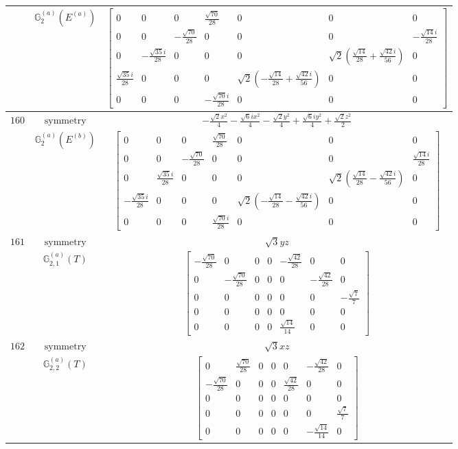 \documentclass[fleqn,8pt,landscape]{jsarticle}
\begin{document}
\begin{longtable}{ccc}
$  $ & $ \mathbb{G}_{2}^{(a)}(E^{(a)}) $ & $ \begin{bmatrix} 0 & 0 & 0 & \frac{\sqrt{70}}{28} & 0 & 0 & 0 \\ 0 & 0 & - \frac{\sqrt{70}}{28} & 0 & 0 & 0 & - \frac{\sqrt{14} i}{28} \\ 0 & - \frac{\sqrt{35} i}{28} & 0 & 0 & 0 & \sqrt{2} \left(\frac{\sqrt{14}}{28} + \frac{\sqrt{42} i}{56}\right) & 0 \\ \frac{\sqrt{35} i}{28} & 0 & 0 & 0 & \sqrt{2} \left(- \frac{\sqrt{14}}{28} + \frac{\sqrt{42} i}{56}\right) & 0 & 0 \\ 0 & 0 & 0 & - \frac{\sqrt{70} i}{28} & 0 & 0 & 0 \end{bmatrix} $ \\ \hline
$ 160 $ & $ \text{symmetry} $ & $ - \frac{\sqrt{2} x^{2}}{4} - \frac{\sqrt{6} i x^{2}}{4} - \frac{\sqrt{2} y^{2}}{4} + \frac{\sqrt{6} i y^{2}}{4} + \frac{\sqrt{2} z^{2}}{2} $ \\
$  $ & $ \mathbb{G}_{2}^{(a)}(E^{(b)}) $ & $ \begin{bmatrix} 0 & 0 & 0 & \frac{\sqrt{70}}{28} & 0 & 0 & 0 \\ 0 & 0 & - \frac{\sqrt{70}}{28} & 0 & 0 & 0 & \frac{\sqrt{14} i}{28} \\ 0 & \frac{\sqrt{35} i}{28} & 0 & 0 & 0 & \sqrt{2} \left(\frac{\sqrt{14}}{28} - \frac{\sqrt{42} i}{56}\right) & 0 \\ - \frac{\sqrt{35} i}{28} & 0 & 0 & 0 & \sqrt{2} \left(- \frac{\sqrt{14}}{28} - \frac{\sqrt{42} i}{56}\right) & 0 & 0 \\ 0 & 0 & 0 & \frac{\sqrt{70} i}{28} & 0 & 0 & 0 \end{bmatrix} $ \\ \hline
$ 161 $ & $ \text{symmetry} $ & $ \sqrt{3} y z $ \\
$  $ & $ \mathbb{G}_{2,1}^{(a)}(T) $ & $ \begin{bmatrix} - \frac{\sqrt{70}}{28} & 0 & 0 & 0 & - \frac{\sqrt{42}}{28} & 0 & 0 \\ 0 & - \frac{\sqrt{70}}{28} & 0 & 0 & 0 & - \frac{\sqrt{42}}{28} & 0 \\ 0 & 0 & 0 & 0 & 0 & 0 & - \frac{\sqrt{7}}{7} \\ 0 & 0 & 0 & 0 & 0 & 0 & 0 \\ 0 & 0 & 0 & 0 & \frac{\sqrt{14}}{14} & 0 & 0 \end{bmatrix} $ \\ \hline
$ 162 $ & $ \text{symmetry} $ & $ \sqrt{3} x z $ \\
$  $ & $ \mathbb{G}_{2,2}^{(a)}(T) $ & $ \begin{bmatrix} 0 & \frac{\sqrt{70}}{28} & 0 & 0 & 0 & - \frac{\sqrt{42}}{28} & 0 \\ - \frac{\sqrt{70}}{28} & 0 & 0 & 0 & \frac{\sqrt{42}}{28} & 0 & 0 \\ 0 & 0 & 0 & 0 & 0 & 0 & 0 \\ 0 & 0 & 0 & 0 & 0 & 0 & \frac{\sqrt{7}}{7} \\ 0 & 0 & 0 & 0 & 0 & - \frac{\sqrt{14}}{14} & 0 \end{bmatrix} $ \\ \hline

\end{longtable}
\end{document}
